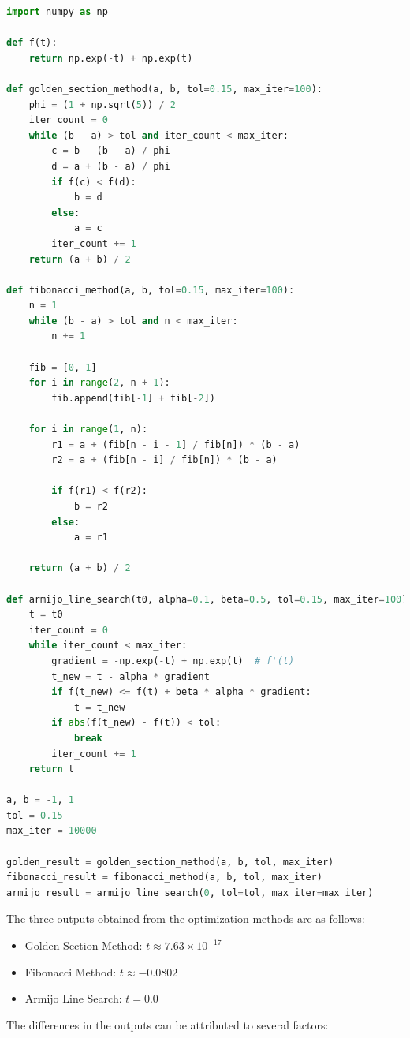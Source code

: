\documentclass{article}
\begin{document}
\begin{lstlisting}[language=Python]
import numpy as np

def f(t):
    return np.exp(-t) + np.exp(t)

def golden_section_method(a, b, tol=0.15, max_iter=100):
    phi = (1 + np.sqrt(5)) / 2
    iter_count = 0
    while (b - a) > tol and iter_count < max_iter:
        c = b - (b - a) / phi
        d = a + (b - a) / phi
        if f(c) < f(d):
            b = d
        else:
            a = c
        iter_count += 1
    return (a + b) / 2

def fibonacci_method(a, b, tol=0.15, max_iter=100):
    n = 1
    while (b - a) > tol and n < max_iter:
        n += 1

    fib = [0, 1]
    for i in range(2, n + 1):
        fib.append(fib[-1] + fib[-2])

    for i in range(1, n):
        r1 = a + (fib[n - i - 1] / fib[n]) * (b - a)
        r2 = a + (fib[n - i] / fib[n]) * (b - a)

        if f(r1) < f(r2):
            b = r2
        else:
            a = r1

    return (a + b) / 2

def armijo_line_search(t0, alpha=0.1, beta=0.5, tol=0.15, max_iter=100):
    t = t0
    iter_count = 0
    while iter_count < max_iter:
        gradient = -np.exp(-t) + np.exp(t)  # f'(t)
        t_new = t - alpha * gradient
        if f(t_new) <= f(t) + beta * alpha * gradient:
            t = t_new
        if abs(f(t_new) - f(t)) < tol:
            break
        iter_count += 1
    return t

a, b = -1, 1
tol = 0.15
max_iter = 10000

golden_result = golden_section_method(a, b, tol, max_iter)
fibonacci_result = fibonacci_method(a, b, tol, max_iter)
armijo_result = armijo_line_search(0, tol=tol, max_iter=max_iter)
\end{lstlisting}

The three outputs obtained from the optimization methods are as follows:
\begin{itemize}
    \item Golden Section Method: \( t \approx 7.63 \times 10^{-17} \)
    \item Fibonacci Method: \( t \approx -0.0802 \)
    \item Armijo Line Search: \( t = 0.0 \)
\end{itemize}

The differences in the outputs can be attributed to several factors:
\end{document}
